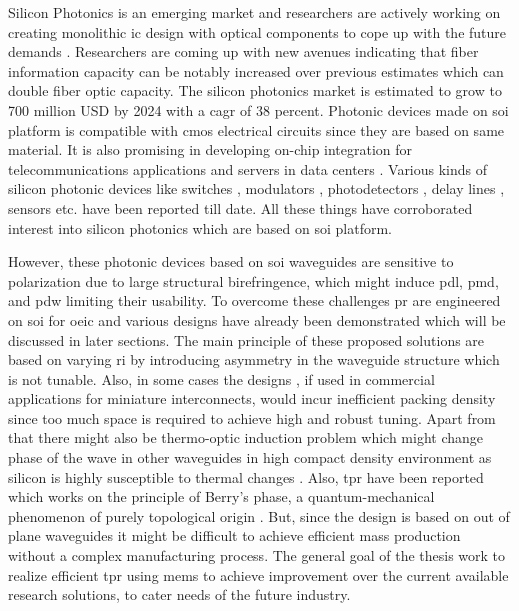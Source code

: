 \documentclass[../report.tex]{subfiles}
\begin{document}
Silicon Photonics is an emerging market and researchers are actively working on creating monolithic \gls{ic} design with optical components to cope up with the future demands \cite{optical_linking}. Researchers are coming up with new avenues indicating that fiber information capacity can be notably increased over previous estimates \cite{temprana_overcoming_2015} which can double fiber optic capacity. The silicon photonics market is estimated to grow to 700 million USD by 2024 \cite{silicon_photonics_growth_2015} with a \gls{cagr} of 38 percent. Photonic devices made on \gls{soi} platform is compatible with \gls{cmos} electrical circuits since they are based on same material. It is also promising in developing on-chip integration for telecommunications applications and servers in data centers \cite{jalali_silicon_2006}. Various kinds of silicon photonic devices like switches \cite{wu_mems-enabled_2015,nikolova_scaling_2015,lu_low-power_2014}, modulators \cite{dong_silicon_2015,chen_generation_2013}, photodetectors \cite{urino_demonstration_2012,chang_high-power_2015}, delay lines \cite{garcia_design_2015,mattarei_variable_2014}, sensors \cite{janz_silicon_2007,lim_laser_2010,ryckeboer_glucose_2014} etc. have been reported till date. All these things have corroborated interest into silicon photonics which are based on \gls{soi} platform.\par   

However, these photonic devices based on \gls{soi} waveguides are sensitive to polarization due to large structural birefringence, which might induce \gls{pdl}, \gls{pmd}, and \gls{pdw} limiting their usability. To overcome these challenges \gls{pr} are engineered on \gls{soi} for \gls{oeic} and various designs have already been demonstrated \cite{xie_efficient_2015,velasco_ultracompact_2012,leung_numerical_2011,wang_design_2014,dai_novel_2011,wirth_efficient_2012,chen_compact_2011} which will be discussed in later sections. The main principle of these proposed solutions are based on varying \gls{ri} by introducing asymmetry in the waveguide structure which is not tunable. Also, in some cases the designs \cite{sarmiento-merenguel_demonstration_2015}, if used in commercial applications for miniature interconnects, would incur inefficient packing density since too much space is required to achieve high and robust tuning. Apart from that there might also be thermo-optic induction problem which might change phase of the wave in other waveguides in high compact density environment as silicon is highly susceptible to thermal changes \cite{ibrahim_athermal_2012}. Also, \gls{tpr} have been reported which works on the principle of Berry’s phase, a quantum-mechanical phenomenon of purely topological origin \cite{xu_electrically_2014}. But, since the design is based on out of plane waveguides it might be difficult to achieve efficient mass production without a complex manufacturing process. The general goal of the thesis work to realize efficient \gls{tpr} using \gls{mems} to achieve improvement over the current available research solutions, to cater needs of the future industry.    
\end{document}
